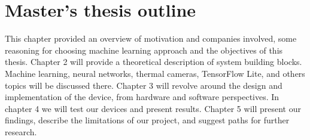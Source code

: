 \section{ Master's thesis outline}

This chapter provided an overview of motivation and companies involved, some reasoning for choosing machine learning approach and the objectives of this thesis.
Chapter 2 will provide a theoretical description of system building blocks. Machine learning, neural networks, thermal cameras, TensorFlow Lite, and others topics will be discussed there.
Chapter 3 will revolve around the design and implementation of the device, from hardware and software perspectives.
In chapter 4 we will test our devices and present results.
Chapter 5 will present our findings, describe the limitations of our project, and suggest paths for further research.

